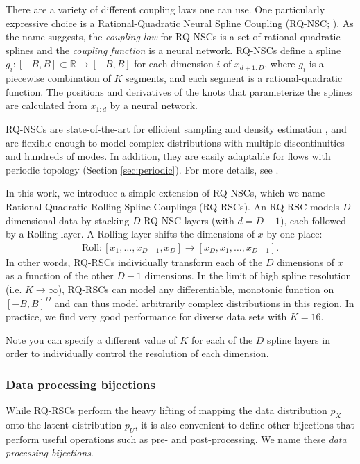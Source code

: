 \documentclass[twocolumn,twocolappendix]{aastex631}
\newcommand{\px}{p^{}_{X}}
\newcommand{\pu}{p^{}_{U}}
\newcommand{\R}{\mathbb{R}}
\begin{document}
There are a variety of different coupling laws one can use.
One particularly expressive choice is a Rational-Quadratic Neural Spline Coupling (RQ-NSC; \citealt{durkan2019}).
As the name suggests, the \emph{coupling law} for RQ-NSCs is a set of rational-quadratic splines and the \emph{coupling function} is a neural network.
RQ-NSCs define a spline $g_i: [-B, B] \subset \R \to [-B, B]$ for each dimension $i$ of $x_{d+1:D}$, where $g_i$ is a piecewise combination of $K$ segments, and each segment is a rational-quadratic function.
The positions and derivatives of the knots that parameterize the splines are calculated from $x_{1:d}$ by a neural network.

RQ-NSCs are state-of-the-art for efficient sampling and density estimation \citep{kobyzev2020}, and are flexible enough to model complex distributions with multiple discontinuities and hundreds of modes.
In addition, they are easily adaptable for flows with periodic topology (Section \ref{sec:periodic}).
For more details, see \citet{durkan2019}.

In this work, we introduce a simple extension of RQ-NSCs, which we name Rational-Quadratic Rolling Spline Couplings (RQ-RSCs).
An RQ-RSC models $D$ dimensional data by stacking $D$ RQ-NSC layers (with $d=D-1$), each followed by a Rolling layer.
A Rolling layer shifts the dimensions of $x$ by one place:
\begin{align}
    \mathrm{Roll}: [x_1, \dots , x_{D-1}, x_D] \to [x_D, x_1, \dots , x_{D-1}].
\end{align}
In other words, RQ-RSCs individually transform each of the $D$ dimensions of $x$ as a function of the other $D-1$ dimensions.
In the limit of high spline resolution (i.e. $K \to \infty$), RQ-RSCs can model any differentiable, monotonic function on $[-B, B]^D$ and can thus model arbitrarily complex distributions in this region.
In practice, we find very good performance for diverse data sets with $K=16$.

Note you can specify a different value of $K$ for each of the $D$ spline layers in order to individually control the resolution of each dimension.

\subsubsection{Data processing bijections}
\label{sec:data-processing}

While RQ-RSCs perform the heavy lifting of mapping the data distribution $\px$ onto the latent distribution $\pu$, it is also convenient to define other bijections that perform useful operations such as pre- and post-processing.
We name these \emph{data processing bijections}.
\end{document}
